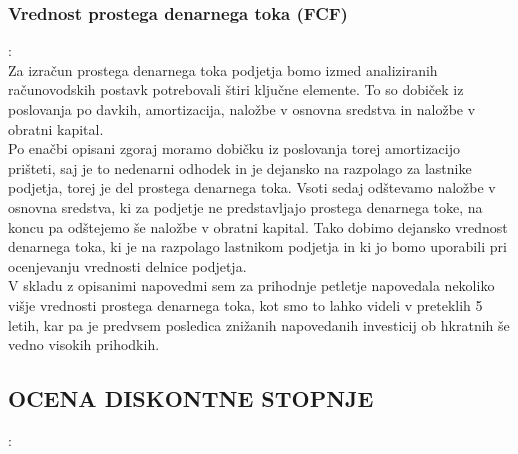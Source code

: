 \documentclass[12pt,a4paper]{amsart}
\theoremstyle{definition} %
\theoremstyle{plain} %
\begin{document}
\subsubsection{Vrednost prostega denarnega toka (FCF)}:\\

Za izračun prostega denarnega toka podjetja bomo izmed analiziranih računovodskih postavk potrebovali štiri ključne elemente. To so dobiček iz poslovanja po davkih, amortizacija, naložbe v osnovna sredstva in naložbe v obratni kapital. \\
Po enačbi opisani zgoraj moramo dobičku iz poslovanja torej amortizacijo prišteti, saj je to nedenarni odhodek in je dejansko na razpolago za lastnike podjetja, torej je del prostega denarnega toka. Vsoti sedaj odštevamo naložbe v osnovna sredstva, ki za podjetje ne predstavljajo prostega denarnega toke, na koncu pa odštejemo še naložbe v obratni kapital. Tako dobimo dejansko vrednost denarnega toka, ki je na razpolago lastnikom podjetja in ki jo bomo uporabili pri ocenjevanju vrednosti delnice podjetja.\\
V skladu z opisanimi napovedmi sem za prihodnje petletje napovedala nekoliko višje vrednosti prostega denarnega toka, kot smo to lahko videli v preteklih 5 letih, kar pa je predvsem posledica znižanih napovedanih investicij ob hkratnih še vedno visokih prihodkih.


\subsection{OCENA DISKONTNE STOPNJE}:\\
\end{document}
